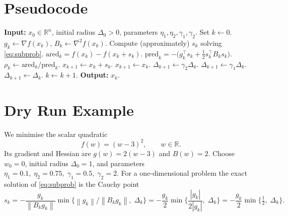 \documentclass[11pt]{article}
\newcommand{\norm}[1]{\left\lVert#1\right\rVert}
\newcommand{\R}{\mathbb{R}}
\begin{document}
\section*{Pseudocode}
\begin{algorithm}[H]
\caption{Trust‑Region Method}
\begin{algorithmic}[1]
\State \textbf{Input:} $x_{0}\in\R^{n}$, initial radius $\Delta_{0}>0$, 
parameters $\eta_{1},\eta_{2},\gamma_{1},\gamma_{2}$.
\State Set $k\gets0$.
\While{$\norm{\nabla f(x_{k})}>\varepsilon$}
    \State $g_{k}\gets\nabla f(x_{k})$, $B_{k}\gets\nabla^{2}f(x_{k})$.
    \State Compute (approximately) $s_{k}$ solving \eqref{eq:subprob}.
    \State $\text{ared}_{k}=f(x_{k})-f(x_{k}+s_{k})$.
    \State $\text{pred}_{k}= -\big(g_{k}^{\top}s_{k}+\tfrac12 s_{k}^{\top}B_{k}s_{k}\big)$.
    \State $\rho_{k}\gets \text{ared}_{k}/\text{pred}_{k}$.
        \State $x_{k+1}\gets x_{k}+s_{k}$.
    \Else
        \State $x_{k+1}\gets x_{k}$.
    \EndIf
        \State $\Delta_{k+1}\gets\gamma_{2}\Delta_{k}$.
        \State $\Delta_{k+1}\gets\gamma_{1}\Delta_{k}$.
    \Else
        \State $\Delta_{k+1}\gets\Delta_{k}$.
    \EndIf
    \State $k\gets k+1$.
\EndWhile
\State \textbf{Output:} $x_{k}$.
\end{algorithmic}
\end{algorithm}

\section*{Dry Run Example}
We minimise the scalar quadratic
\[
f(w)=(w-3)^{2},\qquad w\in\R .
\]
Its gradient and Hessian are $g(w)=2(w-3)$ and $B(w)=2$.  
Choose $w_{0}=0$, initial radius $\Delta_{0}=1$, and parameters
$\eta_{1}=0.1,\;\eta_{2}=0.75,\;\gamma_{1}=0.5,\;\gamma_{2}=2$.  
For a one‑dimensional problem the exact solution of \eqref{eq:subprob} is the Cauchy point
\[
s_{k}= -\frac{g_{k}}{\norm{B_{k}g_{k}}}\min\!\big\{\norm{g_{k}}/ \norm{B_{k}g_{k}},\;\Delta_{k}\big\}
      = -\frac{g_{k}}{2}\min\!\big\{\frac{|g_{k}|}{2|g_{k}|},\;\Delta_{k}\big\}
      =-\frac{g_{k}}{2}\min\!\big\{\tfrac12,\;\Delta_{k}\big\}.
\]
\end{document}
